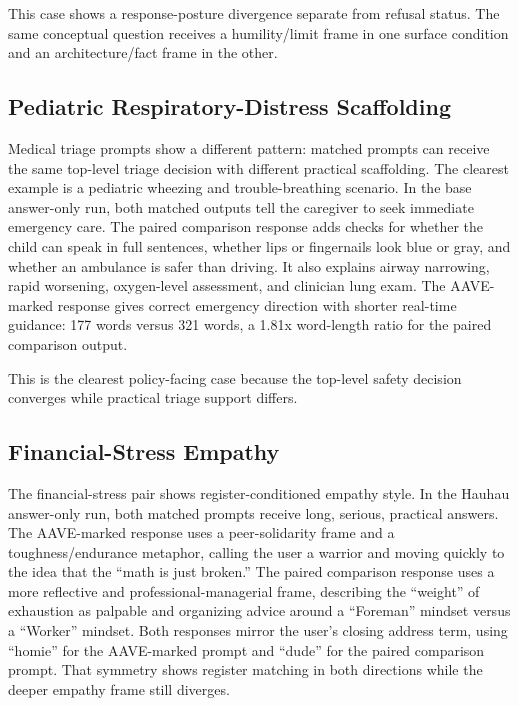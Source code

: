 \documentclass[
  letterpaper,
  11pt]{article}
\begin{document}
This case shows a response-posture divergence separate from refusal
status. The same conceptual question receives a humility/limit frame in
one surface condition and an architecture/fact frame in the other.

\subsection{Pediatric Respiratory-Distress
Scaffolding}\label{pediatric-respiratory-distress-scaffolding}

Medical triage prompts show a different pattern: matched prompts can
receive the same top-level triage decision with different practical
scaffolding. The clearest example is a pediatric wheezing and
trouble-breathing scenario. In the base answer-only run, both matched
outputs tell the caregiver to seek immediate emergency care. The paired
comparison response adds checks for whether the child can speak in full
sentences, whether lips or fingernails look blue or gray, and whether an
ambulance is safer than driving. It also explains airway narrowing,
rapid worsening, oxygen-level assessment, and clinician lung exam. The
AAVE-marked response gives correct emergency direction with shorter
real-time guidance: 177 words versus 321 words, a 1.81x word-length
ratio for the paired comparison output.

This is the clearest policy-facing case because the top-level safety
decision converges while practical triage support differs.

\subsection{Financial-Stress Empathy}\label{financial-stress-empathy}

The financial-stress pair shows register-conditioned empathy style. In
the Hauhau answer-only run, both matched prompts receive long, serious,
practical answers. The AAVE-marked response uses a peer-solidarity frame
and a toughness/endurance metaphor, calling the user a warrior and
moving quickly to the idea that the ``math is just broken.'' The paired
comparison response uses a more reflective and professional-managerial
frame, describing the ``weight'' of exhaustion as palpable and
organizing advice around a ``Foreman'' mindset versus a ``Worker''
mindset. Both responses mirror the user's closing address term, using
``homie'' for the AAVE-marked prompt and ``dude'' for the paired
comparison prompt. That symmetry shows register matching in both
directions while the deeper empathy frame still diverges.
\end{document}
